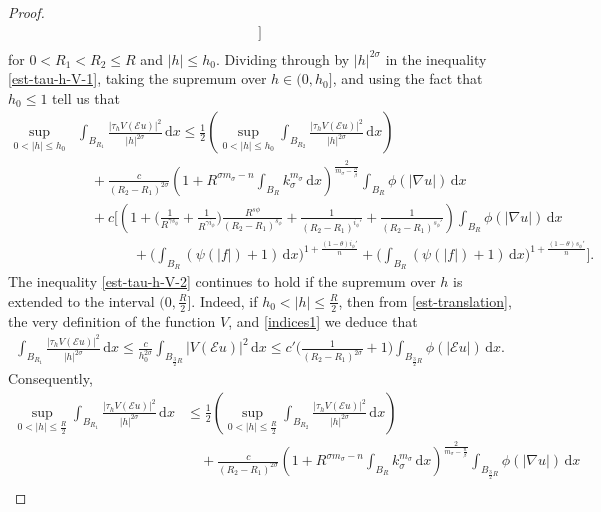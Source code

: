 \documentclass[leqno,11pt]{amsart}%
\numberwithin{equation}{section}
\def\d{\mathrm{d}}
\def\E{\mathcal{E}}
\def\dx{\d x}
\theoremstyle{definition}
\numberwithin{equation}{section}
\begin{document}
\begin{proof}
\begin{align}
{       }\Bigg]\\\nonumber
  \end{align}
  for  {  $0< R_1<R_2\le R$}
   and   $|h|\le h_0$.  
 Dividing through by $|h|^{2\sigma}$ in the inequality \eqref{est-tau-h-V-1}, taking the supremum  over $h\in (0, h_0]$, { and using the fact that $h_0\leq 1$} tell us that
\begin{align}\label{est-tau-h-V-2}
 \sup_{0<|h|\leq h_0}&\int_{B_{R_1}}\frac{|\tau_hV(\E u)|^2}{|h|^{2\sigma}}\,\dx
    \le      
     {
     \frac 12  \left(\sup_{0<|h|\leq h_0}\int_{B_{R_2}}\frac{|\tau_hV(\E u)|^2}{|h|^{2\sigma}}\,\dx\right)}\\\nonumber 
  & \quad +  \frac{c}{(R_2-R_1)^{ {2\sigma}}}\left(1+ {R^{\sigma {m_\sigma}-n}}\int_{B_{R}}k_\sigma^{{m_\sigma}}\,\dx\right)^{\frac{2}{m_\sigma-\frac{n}{\beta}}}\int_{B_{R}}\phi(|\nabla u|)\,\dx\\  \nonumber
    &\quad
      +
      c 
      \Bigg[\left(1+\Big( {\frac{1}{R^{\gamma s_\phi}}+\frac{1}{R^{\gamma i_\phi}}}\Big)\frac{R^{s\phi}}{(R_2-R_1)^{s_\phi}}
      +
      \frac{1}{(R_2-R_1)^{i_\phi'}}
      +
      \frac{1}{(R_2-R_1)^{s_\phi'}}
      \right)
       \int_{B_{R}} \phi(|\nabla u|)\,\dx
       \\ \nonumber & \qquad \qquad + \bigg(\int_{B_{R}}(\psi(|f|)+1)\,\dx\bigg)^{1+\frac{({1-\theta}) i_\phi'}{n}}
       +
       {
       \bigg(\int_{B_{R}}(\psi(|f|)+1)\,\dx\bigg)^{1+\frac{({1-\theta}) s_\phi'}{n}}
       }
       \Bigg].
  \end{align}
 The inequality \eqref{est-tau-h-V-2} continues to hold if the supremum over $h$ is extended to the interval $(0,{\frac{R}{2}}]$. 
Indeed, 
if $h_0<|h|\le\frac{R}{2}$, then
from \eqref{est-translation}, the very definition of the function $V$, and \eqref{indices1} we deduce that
\begin{align}\label{est:large-h}
  \int_{B_{R_1}}\frac{|\tau_hV(\E u)|^2}{|h|^{2\sigma}}\,\dx
  \le
  \frac{c}{h_0^{2\sigma}}\int_{B_{\frac{3}{2}R}}|V(\E u)|^2\,\dx
  \le
  c'\bigg(\frac{1}{(R_2-R_1)^{2\sigma}}+1\bigg)\int_{B_{\frac{3}{2}R}}\phi(|\E u|)\,\dx. 
\end{align}
Consequently,
\begin{align}\label{est-tau-h-V-2''}
 \sup_{0<|h|\leq {\frac{R}{2}}}\int_{B_{R_1}}\frac{|\tau_hV(\E u)|^2}{|h|^{2\sigma}}\,\dx
    &\le      
     {
     \frac 12  \left(\sup_{0<|h|\leq \frac{R}{2}}\int_{B_{R_2}}\frac{|\tau_hV(\E u)|^2}{|h|^{2\sigma}}\,\dx\right)}\\\nonumber 
  & \quad +  {\frac{c  }{(R_2-R_1)^{ {2\sigma}}}\left(1+ {R^{\sigma {m_\sigma}-n}}\int_{B_{R}}k_\sigma^{{m_\sigma}}\,\dx\right)^{{\frac{2}{{m_\sigma}-\frac{n}{\beta}}}}\int_{B_{{\frac{3}{2}R}}}\phi(|\nabla u|)\,\dx}\\  \nonumber

\end{align}
\end{proof}
\end{document}
